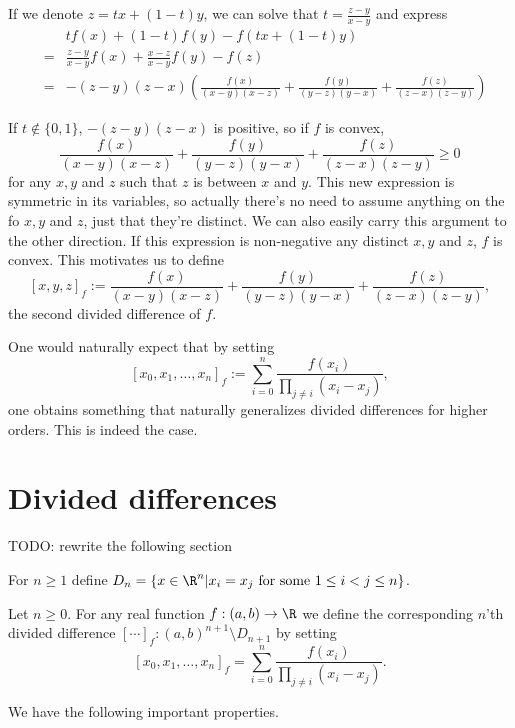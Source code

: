 If we denote $z = t x + (1 - t) y$, we can solve that $t = \frac{z - y}{x - y}$ and express
\begin{eqnarray*}
	&& t f(x) + (1 - t) f(y) - f(t x + (1 - t)y) \\
	&=& \frac{z - y}{x - y} f(x) + \frac{x - z}{x - y} f(y) - f(z) \\
	&=& -(z - y)(z - x) \left(\frac{f(x)}{(x - y)(x - z)} + \frac{f(y)}{(y - z)(y - x)} + \frac{f(z)}{(z - x)(z - y)} \right)
\end{eqnarray*}

If $t \notin \{0, 1\}$, $-(z - y)(z - x)$ is positive, so if $f$ is convex,
\[
	\frac{f(x)}{(x - y)(x - z)} + \frac{f(y)}{(y - z)(y - x)} + \frac{f(z)}{(z - x)(z - y)} \geq 0
\]
for any $x, y$ and $z$ such that $z$ is between $x$ and $y$. This new expression is symmetric in its variables, so actually there's no need to assume anything on the fo $x, y$ and $z$, just that they're distinct. We can also easily carry this argument to the other direction. If this expression is non-negative any distinct $x, y$ and $z$, $f$ is convex. This motivates us to define
\[
	[x, y, z]_{f} := \frac{f(x)}{(x - y)(x - z)} + \frac{f(y)}{(y - z)(y - x)} + \frac{f(z)}{(z - x)(z - y)},
\]
the second divided difference of $f$.

One would naturally expect that by setting
\[ 
	[x_{0}, x_{1}, \ldots, x_{n}]_{f} := \sum_{i = 0}^{n} \frac{f(x_{i})}{\prod_{j \neq i} (x_{i} - x_{j})},
\]
one obtains something that naturally generalizes divided differences for higher orders. This is indeed the case.

\section{Divided differences}

TODO: rewrite the following section

For $n \geq 1$ define $D_{n} = \{x\in \R^{n} | x_{i} = x_{j} \text{ for some $1 \leq i < j \leq n$}\}$.
\begin{maar}
Let $n \geq 0$. For any real function $f : (a, b) \to \R$ we define the corresponding $n$'th divided difference $[\cdots]_{f} : (a, b)^{n + 1} \setminus D_{n + 1}$ by setting
\[
	[x_{0}, x_{1}, \ldots, x_{n}]_{f} = \sum_{i = 0}^{n} \frac{f(x_{i})}{\prod_{j \neq i} (x_{i} - x_{j})}.
\]
\end{maar}

We have the following important properties.

